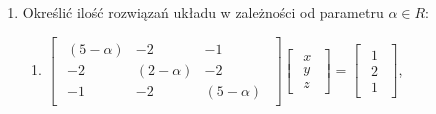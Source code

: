 \documentclass{article}
\begin{document}
\begin{enumerate}
\begin{enumerate}
              \item $\begin{bmatrix}\begin{array}{rrrr} 1 & 2 & 7 & -1\\ 1 & 5 & 7 & -1\\ 1 & 4 & 7 & -1 \end{array}\end{bmatrix} \begin{bmatrix}\begin{array}{r} x\\ y\\ z\\ t \end{array}\end{bmatrix} = \begin{bmatrix}\begin{array}{r} 1\\ 1\\ 1 \end{array}\end{bmatrix}$.
        \end{enumerate}

        \item Określić ilość rozwiązań układu w zależności od parametru $\alpha \in R$:
            \begin{enumerate} 
                \item $\begin{bmatrix}\begin{array}{rrr} (5-\alpha) & -2 & -1\\ -2 & (2-\alpha) & -2\\ -1 & -2 & (5-\alpha) \end{array}\end{bmatrix} \begin{bmatrix}\begin{array}{r} x\\ y\\ z \end{array}\end{bmatrix} = \begin{bmatrix}\begin{array}{r} 1\\ 2\\ 1 \end{array}\end{bmatrix}$,


\end{enumerate}
\end{enumerate}
\end{document}
